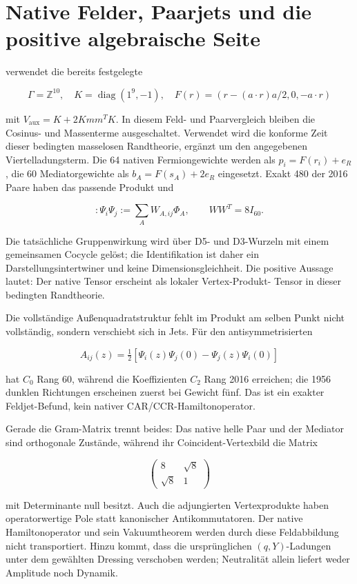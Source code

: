 \section{Native Felder, Paarjets und die positive algebraische Seite}

 verwendet die bereits festgelegte

\[
 \Gamma=\mathbb Z^{10},\quad K=\operatorname{diag}(1^9,-1),\quad
 F(r)=(r-(a\cdot r)a/2,0,-a\cdot r)
\]

mit \(V_\mathrm{aux}=K+2Kmm^TK\). In diesem Feld- und Paarvergleich bleiben die Cosinus- und Massenterme ausgeschaltet. Verwendet wird die konforme Zeit dieser bedingten masselosen Randtheorie, ergänzt um den angegebenen Viertelladungsterm. Die 64 nativen Fermiongewichte werden als
\(p_i=F(r_i)+e_R\), die 60 Mediatorgewichte als \(b_A=F(s_A)+2e_R\)
eingesetzt. Exakt 480 der 2016 Paare haben das passende Produkt und

\[
 :\Psi_i\Psi_j:=\sum_AW_{A,ij}\Phi_A,\qquad WW^T=8I_{60}.
\]

Die tatsächliche Gruppenwirkung wird über D5- und D3-Wurzeln mit einem
gemeinsamen Cocycle gelöst; die Identifikation ist daher ein
Darstellungsintertwiner und keine Dimensionsgleichheit. Die positive
Aussage lautet: Der native Tensor erscheint als lokaler Vertex-Produkt-
Tensor in dieser bedingten Randtheorie.

Die vollständige Außenquadratstruktur fehlt im Produkt am selben Punkt nicht
vollständig, sondern verschiebt sich in Jets. Für den antisymmetrisierten

\[
 A_{ij}(z)=\tfrac12[\Psi_i(z)\Psi_j(0)-\Psi_j(z)\Psi_i(0)]
\]

hat \(C_0\) Rang 60, während die Koeffizienten \(C_2\) Rang 2016 erreichen;
die 1956 dunklen Richtungen erscheinen zuerst bei Gewicht fünf. Das ist ein
exakter Feldjet-Befund, kein nativer CAR/CCR-Hamiltonoperator.

Gerade die Gram-Matrix trennt beides: Das native helle Paar und der Mediator
sind orthogonale Zustände, während ihr Coincident-Vertexbild die Matrix

\[
 \begin{pmatrix}8&\sqrt8\\\sqrt8&1\end{pmatrix}
\]

mit Determinante null besitzt. Auch die adjungierten Vertexprodukte haben
operatorwertige Pole statt kanonischer Antikommutatoren. Der native
Hamiltonoperator und sein Vakuumtheorem werden durch diese Feldabbildung
nicht transportiert. Hinzu kommt, dass die ursprünglichen $(q,Y)$-Ladungen
unter dem gewählten Dressing verschoben werden; Neutralität allein liefert
weder Amplitude noch Dynamik.

